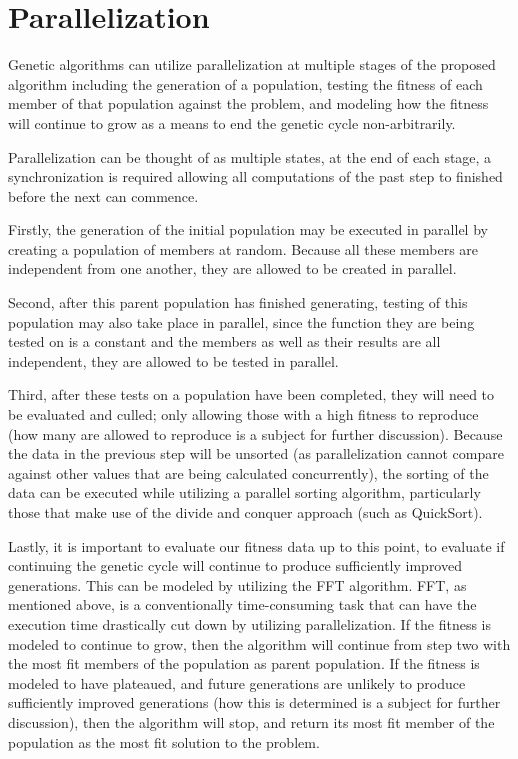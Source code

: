 \documentclass{article}
\renewcommand{\_}{\ifincsname_\else\legacyunderscore\fi}
\begin{document}
\section*{Parallelization}
Genetic algorithms can utilize parallelization at multiple stages of the proposed algorithm including the generation of a population, testing the fitness of each member of that population against the problem, and modeling how the fitness will continue to grow as a means to end the genetic cycle non-arbitrarily. 

Parallelization can be thought of as multiple states, at the end of each stage, a synchronization is required allowing all computations of the past step to finished before the next can commence.

Firstly, the generation of the initial population may be executed in parallel by creating a population of members at random. Because all these members are independent from one another, they are allowed to be created in parallel. 

Second, after this parent population has finished generating, testing of this population may also take place in parallel, since the function they are being tested on is a constant and the members as well as their results are all independent, they are allowed to be tested in parallel.

Third, after these tests on a population have been completed, they will need to be evaluated and culled; only allowing those with a high fitness to reproduce (how many are allowed to reproduce is a subject for further discussion). Because the data in the previous step will be unsorted (as parallelization cannot compare against other values that are being calculated concurrently), the sorting of the data can be executed while utilizing a parallel sorting algorithm, particularly those that make use of the divide and conquer approach (such as QuickSort).

Lastly, it is important to evaluate our fitness data up to this point, to evaluate if continuing the genetic cycle will continue to produce sufficiently improved generations. This can be modeled by utilizing the FFT algorithm. FFT, as mentioned above, is a conventionally time-consuming task that can have the execution time drastically cut down by utilizing parallelization. If the fitness is modeled to continue to grow, then the algorithm will continue from step two with the most fit members of the population as parent population. If the fitness is modeled to have plateaued, and future generations are unlikely to produce sufficiently improved generations (how this is determined is a subject for further discussion), then the algorithm will stop, and return its most fit member of the population as the most fit solution to the problem.
\end{document}
